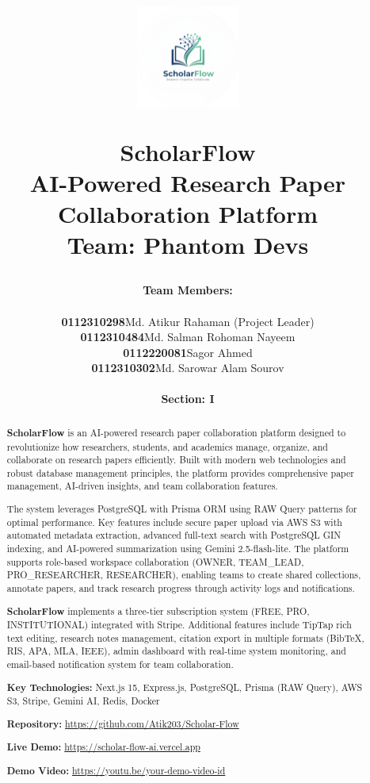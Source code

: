\documentclass[12pt,a4paper,openany]{report}
\title{
    \vspace{-2cm}
    \begin{figure}[h]
    \centering
    \includegraphics[width=0.3\textwidth]{images/logos/logo.png}
    \end{figure}
    \vspace{0.3cm}
    {\LARGE\textbf{ScholarFlow}}\\
    \vspace{0.3cm}
    {\large AI-Powered Research Paper Collaboration Platform}\\
    \vspace{0.5cm}
    {\normalsize\textbf{Team: Phantom Devs}}\\
    \vspace{0.5cm}
}
\author{
    \textbf{Team Members:}\\[0.5cm]
    \begin{tabular}{rl}
    \textbf{0112310298} & Md. Atikur Rahaman (Project Leader) \\
    \textbf{0112310484} & Md. Salman Rohoman Nayeem \\
    \textbf{0112220081} & Sagor Ahmed \\
    \textbf{0112310302} & Md. Sarowar Alam Sourov \\
    \end{tabular}
    \\[1cm]
    {\normalsize\textbf{Section: I}}
}
\newcommand{\projectname}{\textbf{ScholarFlow}}
\begin{document}
\maketitle
\thispagestyle{empty}

\newpage

\begin{abstract}
\noindent
\projectname{} is an AI-powered research paper collaboration platform designed to revolutionize how researchers, students, and academics manage, organize, and collaborate on research papers efficiently. Built with modern web technologies and robust database management principles, the platform provides comprehensive paper management, AI-driven insights, and team collaboration features.

\vspace{0.3cm}
\noindent
The system leverages PostgreSQL with Prisma ORM using RAW Query patterns for optimal performance. Key features include secure paper upload via AWS S3 with automated metadata extraction, advanced full-text search with PostgreSQL GIN indexing, and AI-powered summarization using Gemini 2.5-flash-lite. The platform supports role-based workspace collaboration (OWNER, TEAM\_LEAD, PRO\_RESEARCHER, RESEARCHER), enabling teams to create shared collections, annotate papers, and track research progress through activity logs and notifications.

\vspace{0.3cm}
\noindent
\projectname{} implements a three-tier subscription system (FREE, PRO, INSTITUTIONAL) integrated with Stripe. Additional features include TipTap rich text editing, research notes management, citation export in multiple formats (BibTeX, RIS, APA, MLA, IEEE), admin dashboard with real-time system monitoring, and email-based notification system for team collaboration.

\vspace{0.3cm}
\noindent
\textbf{Key Technologies:} Next.js 15, Express.js, PostgreSQL, Prisma (RAW Query), AWS S3, Stripe, Gemini AI, Redis, Docker

\vspace{0.3cm}
\noindent
\textbf{Repository:} \url{https://github.com/Atik203/Scholar-Flow}

\vspace{0.3cm}
\noindent
\textbf{Live Demo:} \url{https://scholar-flow-ai.vercel.app}

\vspace{0.3cm}
\noindent
\textbf{Demo Video:} \url{https://youtu.be/your-demo-video-id}
\end{abstract}
\end{document}
